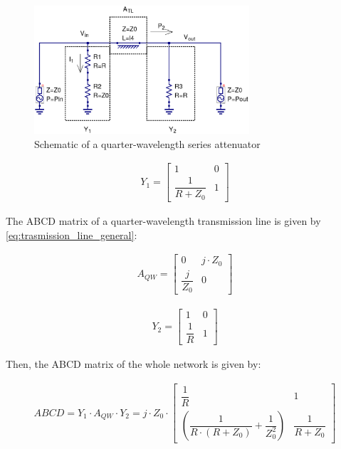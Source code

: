 \begin{figure}[ht]
\begin{center}
\includegraphics[width=8cm]{QW-Series-Attenuator-Schematic}
\end{center}
\caption{Schematic of a quarter-wavelength series attenuator}
\label{fig:qw-series-att-schematic}
\end{figure}
\FloatBarrier


\begin{gather}
 Y_{1} = 
 \begin{bmatrix} 1 & 0 \\ \dfrac{1}{R + Z_0} & 1 \end{bmatrix}
\end{gather}

\noindent The ABCD matrix of a quarter-wavelength transmission line is given by \ref{eq:trasmission_line_general}:

\begin{gather}
 A_{QW} = 
 \begin{bmatrix} 0 & j \cdot Z_0 \\ \dfrac{j}{Z_0} & 0 \end{bmatrix}
\end{gather}

\begin{gather}
 Y_{2} = 
 \begin{bmatrix} 1 & 0 \\ \dfrac{1}{R} & 1 \end{bmatrix}
\end{gather}

\noindent Then, the ABCD matrix of the whole network is given by:

\begin{gather}
 ABCD = Y_{1} \cdot A_{QW} \cdot Y_{2} = j \cdot Z_0 \cdot 
 \begin{bmatrix} \dfrac{1}{R} & 1 \\ \left( \dfrac{1}{R \cdot (R + Z_0)} + \dfrac{1}{Z_0^2}\right) & \dfrac{1}{R+Z_0} \end{bmatrix}
\end{gather}

